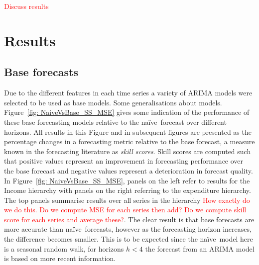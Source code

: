 \documentclass[graybox]{svmult}
\def\naive{na\"{i}ve\ }
\begin{document}
\textcolor{red}{Discuss results}


%
%
%
%




\section{Results}\label{sec:results}

\subsection{Base forecasts}

Due to the different features in each time series a variety of ARIMA models were selected to be used as base models.  {\color{red} Some generalisations about models}.  Figure~\ref{fig: NaiveVsBase_SS_MSE} gives some indication of the performance of these base forecasting models relative to the \naive forecast over different horizons.  All results in this Figure and in subsequent figures are presented as the percentage changes in a forecasting metric relative to the base forecast, a measure known in the forecasting literature as {\em skill scores}.  Skill scores are computed such that positive values represent an improvement in forecasting performance over the base forecast and negative values represent a deterioration in forecast quality.  In Figure~\ref{fig: NaiveVsBase_SS_MSE}, panels on the left refer to results for the Income hierarchy with panels on the right referring to the expenditure hierarchy.  The top panels summarise results over all series in the hierarchy \textcolor{red} {How exactly do we do this.  Do we compute MSE for each series then add?  Do we compute skill score for each series and average these?}.  The clear result is that base forecasts are more accurate than \naive forecasts, however as the forecasting horizon increases, the difference becomes smaller.  This is to be expected since the \naive model here is a seasonal random walk, for horizons $h<4$ the forecast from an ARIMA model is based on more recent information.
\end{document}
